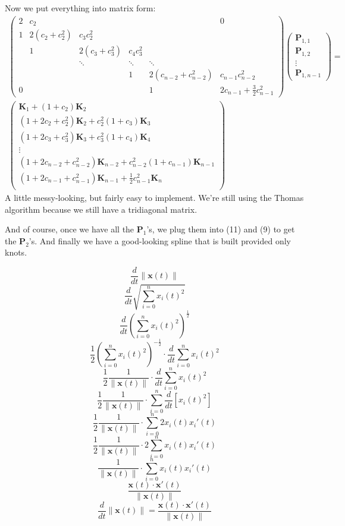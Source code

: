 \documentclass[10pt]{article}
\renewcommand{\vec}[1]{\mathbf{#1}}
\newcommand{\norm}[1]{\lVert#1\rVert}
\begin{document}
	Now we put everything into matrix form:
	\begin{equation}
		\begin{split}
			\begin{pmatrix}
				2 & c_{2} &   &   &   & 0 \\
				1 & 2(c_{2}+c_{2}^{2}) & c_{3}c_{2}^{2} \\
				\ & 1 & 2(c_{3}+c_{3}^{2}) & c_{4}c_{3}^{2} \\
				\ & \ & \ddots & \ddots & \ddots \\
				\ & \ & \ & 1 & 2(c_{n-2}+c_{n-2}^{2}) & c_{n-1}c_{n-2}^{2} \\
				0 & \ & \ & \ & 1 & 2c_{n-1}+\frac{3}{2}c_{n-1}^{2}
			\end{pmatrix}
			\begin{pmatrix}
				\vec{P}_{1,1} \\
				\vec{P}_{1,2} \\
				\vdots \\
				\vec{P}_{1,n-1}
			\end{pmatrix}
			=\\
			\begin{pmatrix}
				\vec{K}_{1}+(1+c_{2})\vec{K}_{2}\\
				(1+2c_{2}+c_{2}^{2})\vec{K}_{2}+c_{2}^{2}(1+c_{3})\vec{K}_{3}\\
				(1+2c_{3}+c_{3}^{2})\vec{K}_{3}+c_{3}^{2}(1+c_{4})\vec{K}_{4}\\
				\vdots \\
				(1+2c_{n-2}+c_{n-2}^{2})\vec{K}_{n-2}+c_{n-2}^{2}(1+c_{n-1})\vec{K}_{n-1}\\
				(1+2c_{n-1}+c_{n-1}^{2})\vec{K}_{n-1}+\frac{1}{2}c_{n-1}^{2}\vec{K}_{n}\\
			\end{pmatrix}
		\end{split}
	\end{equation}
	A little messy-looking, but fairly easy to implement. We're still using the
	Thomas algorithm because we still have a tridiagonal matrix.

	And of course, once we have all the $\vec{P}_{1}$'s, we plug them into
	(11) and (9) to get the $\vec{P}_{2}$'s. And finally we have a good-looking
	spline that is built provided only knots.

	\clearpage

	$$\frac{d}{dt}\norm{\vec{x}(t)}$$
	$$\frac{d}{dt}\sqrt{\sum_{i=0}^{n}x_{i}(t)^{2}}$$
	$$\frac{d}{dt}(\sum_{i=0}^{n}x_{i}(t)^{2})^{\frac{1}{2}}$$
	$$\frac{1}{2}(\sum_{i=0}^{n}x_{i}(t)^{2})^{-\frac{1}{2}} \cdot \frac{d}{dt}\sum_{i=0}^{n}x_{i}(t)^{2}$$
	$$\frac{1}{2}\frac{1}{\norm{\vec{x}(t)}} \cdot \frac{d}{dt}\sum_{i=0}^{n}x_{i}(t)^{2}$$
	$$\frac{1}{2}\frac{1}{\norm{\vec{x}(t)}} \cdot \sum_{i=0}^{n}\frac{d}{dt}[x_{i}(t)^{2}]$$
	$$\frac{1}{2}\frac{1}{\norm{\vec{x}(t)}} \cdot \sum_{i=0}^{n}2x_{i}(t)x_{i}'(t)$$
	$$\frac{1}{2}\frac{1}{\norm{\vec{x}(t)}} \cdot 2\sum_{i=0}^{n}x_{i}(t)x_{i}'(t)$$
	$$\frac{1}{\norm{\vec{x}(t)}} \cdot \sum_{i=0}^{n}x_{i}(t)x_{i}'(t)$$
	$$\frac{\vec{x}(t)\cdot\vec{x}'(t)}{\norm{\vec{x}(t)}}$$
	$$\frac{d}{dt}\norm{\vec{x}(t)} = \frac{\vec{x}(t)\cdot\vec{x}'(t)}{\norm{\vec{x}(t)}}$$
\end{document}

